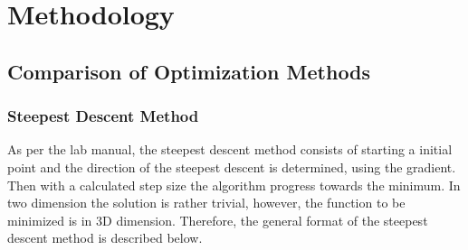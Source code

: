 \documentclass[12pt]{article}
\begin{document}
\section{Methodology}
\subsection{Comparison of Optimization Methods}
\subsubsection{Steepest Descent Method}
As per the lab manual, the steepest descent method consists of starting a initial point and the direction of the steepest descent is determined, using the gradient. Then with a calculated step size the algorithm progress towards the minimum. In two dimension  the solution is rather trivial, however, the function to be minimized is in 3D dimension. Therefore, the general format of the steepest descent method is described below.
\end{document}
